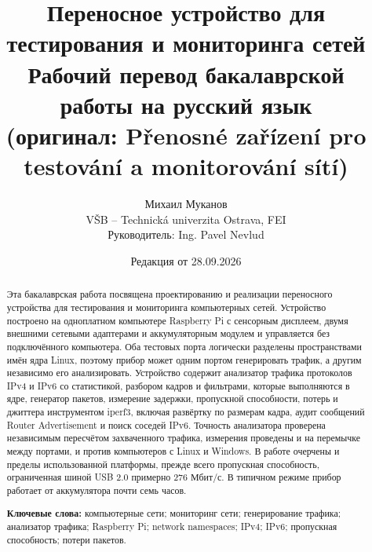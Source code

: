 \documentclass[a4paper,11pt]{report}
\title{Переносное устройство для тестирования и мониторинга сетей\\[0.5em]
\large Рабочий перевод бакалаврской работы на русский язык\\
(оригинал: Přenosné zařízení pro testování a monitorování sítí)}
\author{Михаил Муканов\\ VŠB -- Technická univerzita Ostrava, FEI\\ Руководитель: Ing. Pavel Nevlud}
\date{Редакция от 28.09.2026}
\begin{document}
\maketitle

\begin{abstract}
Эта бакалаврская работа посвящена проектированию и реализации переносного устройства для тестирования и мониторинга компьютерных сетей. Устройство построено на одноплатном компьютере Raspberry Pi с сенсорным дисплеем, двумя внешними сетевыми адаптерами и аккумуляторным модулем и управляется без подключённого компьютера. Оба тестовых порта логически разделены пространствами имён ядра Linux, поэтому прибор может одним портом генерировать трафик, а другим независимо его анализировать. Устройство содержит анализатор трафика протоколов IPv4 и IPv6 со статистикой, разбором кадров и фильтрами, которые выполняются в ядре, генератор пакетов, измерение задержки, пропускной способности, потерь и джиттера инструментом iperf3, включая развёртку по размерам кадра, аудит сообщений Router Advertisement и поиск соседей IPv6. Точность анализатора проверена независимым пересчётом захваченного трафика, измерения проведены и на перемычке между портами, и против компьютеров с Linux и Windows. В работе очерчены и пределы использованной платформы, прежде всего пропускная способность, ограниченная шиной USB 2.0 примерно 276 Мбит/с. В типичном режиме прибор работает от аккумулятора почти семь часов.

\medskip
\noindent\textbf{Ключевые слова:} компьютерные сети; мониторинг сети; генерирование трафика; анализатор трафика; Raspberry Pi; network namespaces; IPv4; IPv6; пропускная способность; потери пакетов.
\end{abstract}

\tableofcontents
\listoffigures
\listoftables






\printbibliography[title={Литература}, heading=bibintoc]

\appendix

\end{document}
